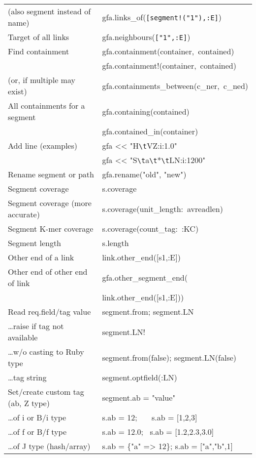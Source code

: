 \documentclass[12pt]{scrartcl}
\begin{document}
\begin{tabular}{|l|>{\ttfamily}l|}
  (also segment instead of name) &
  gfa.links\_of(\verb/[segment!("1"),:E]/) \\
  Target of all links & gfa.neighbours(\verb/["1",:E]/) \\
  \hline
  Find containment  & gfa.containment(container,~contained)\\
                    & gfa.containment!(container,~contained)\\
  (or, if multiple may exist)  & gfa.containments\_between(c\_ner,~c\_ned)\\
  All containments for a segment & gfa.containing(contained)\\
                                 & gfa.contained\_in(container)\\
  \hline
  Add line (examples)        & gfa << "H\verb/\t/VZ:i:1.0" \\
                             & gfa << "S\verb/\t/a\verb/\t/*\verb/\t/LN:i:1200" \\
  Rename segment or path & gfa.rename("old", "new") \\
  \hline
  Segment coverage & s.coverage\\
  Segment coverage (more accurate) & s.coverage(unit\_length:~avreadlen)\\
  Segment K-mer coverage & s.coverage(count\_tag:~:KC)\\
  Segment length & s.length\\
  Other end of a link & link.other\_end([s1,:E])\\
  Other end of other end of link &
  gfa.other\_segment\_end(\\
  & \hspace{2.8cm}link.other\_end([s1,:E]))\\
  \hline
  Read req.field/tag value & segment.from; segment.LN \\
  \ldots raise if tag not available & segment.LN! \\
  \ldots w/o casting to Ruby type & segment.from(false); segment.LN(false)\\
  \ldots tag string & segment.optfield(:LN) \\
  \hline
  Set/create custom tag (ab, Z type) & segment.ab = "value" \\
  \ldots of i or B/i type & s.ab = 12; \ \ \ s.ab = [1,2,3]\\
  \ldots of f or B/f type & s.ab = 12.0; \ s.ab = [1.2,2.3,3.0] \\
  \ldots of J type (hash/array) & s.ab = \{"a" => 12\}; s.ab = ["a","b",1] \\
  \hline

\end{tabular}
\end{document}
